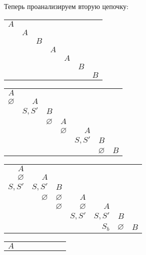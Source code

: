 \documentclass[12pt]{article}
\newenvironment{Problems}{
	\begin{enumerate}[]
	}{       
	\end{enumerate}
}
\begin{document}
\begin{Problems}
	Теперь проанализируем вторую цепочку:
	\begin{center}
		\begin{tabular}{|r|r|r|r|r|r|r|}
			\cline{1-1}
			$A$\\
			\cline{1-2}
			& $A$\\
			\cline{1-3}
			& & $B$\\
			\cline{1-4}
			& & & $A$\\
			\cline{1-5}
			& & & & $A$\\
			\cline{1-6}
			& & & & & $B$\\
			\hline
			& & & & & & $B$\\
			\hline
		\end{tabular}
	\end{center}
	\begin{center}
		\begin{tabular}{|r|r|r|r|r|r|r|}
			\cline{1-1}
			$A$\\
			\cline{1-2}
			$\varnothing$ & $A$\\
			\cline{1-3}
			& $S, S'$ & $B$\\
			\cline{1-4}
			& & $\varnothing$ & $A$\\
			\cline{1-5}
			& & & $\varnothing$ & $A$\\
			\cline{1-6}
			& & & & $S, S'$ & $B$\\
			\hline
			& & & & & $\varnothing$ & $B$\\
			\hline
		\end{tabular}
	\end{center}
	\begin{center}
		\begin{tabular}{|r|r|r|r|r|r|r|}
			\cline{1-1}
			$A$\\
			\cline{1-2}
			$\varnothing$ & $A$\\
			\cline{1-3}
			$S, S'$ & $S, S'$ & $B$\\
			\cline{1-4}
			& $\varnothing$ & $\varnothing$ & $A$\\
			\cline{1-5}
			& & $\varnothing$ & $\varnothing$ & $A$\\
			\cline{1-6}
			& & & $S, S'$ & $S, S'$ & $B$\\
			\hline
			& & & & $S_b$& $\varnothing$ & $B$\\
			\hline
		\end{tabular}
	\end{center}
	\begin{center}
		\begin{tabular}{|r|r|r|r|r|r|r|}
			\cline{1-1}
			$A$\\

\end{tabular}
\end{center}
\end{Problems}
\end{document}
